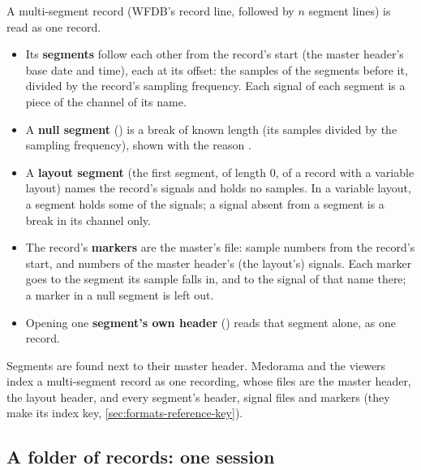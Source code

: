 A multi-segment record (WFDB's  record line, followed by $n$ segment lines) is read
as one record.
\begin{itemize}
\item Its \textbf{segments} follow each other from the record's start (the master header's base
  date and time), each at its offset: the samples of the segments before it, divided by the
  record's sampling frequency. Each signal of each segment is a piece of the channel of its name.
\item A \textbf{null segment} (\code{\textasciitilde}) is a break of known length (its samples
  divided by the sampling frequency), shown with the reason .
\item A \textbf{layout segment} (the first segment, of length 0, of a record with a variable
  layout) names the record's signals and holds no samples. In a variable layout, a segment holds
  some of the signals; a signal absent from a segment is a break in its channel only.
\item The record's \textbf{markers} are the master's  file: sample numbers from the
  record's start, and  numbers of the master header's (the layout's) signals. Each
  marker goes to the segment its sample falls in, and to the signal of that name there; a marker
  in a null segment is left out.
\item Opening one \textbf{segment's own header} () reads that segment
  alone, as one record.
\end{itemize}
Segments are found next to their master header. Medorama and the viewers index a multi-segment
record as one recording, whose files are the master header, the layout header, and every
segment's header, signal files and markers (they make its index key,
\cref{sec:formats-reference-key}).

\subsection{A folder of records: one session}
\label{sec:recordings-session}


